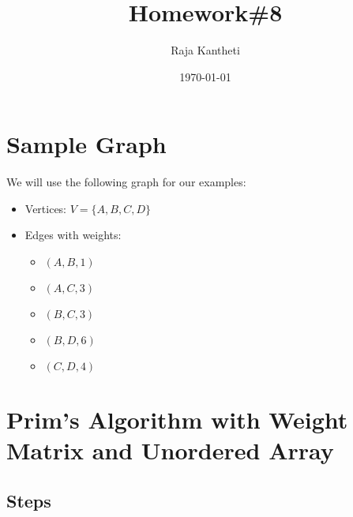 \documentclass{article}
\title{Homework\#8}
\author{Raja Kantheti}
\date{\today}
\begin{document}
\maketitle

\section{Sample Graph}

We will use the following graph for our examples:
\begin{itemize}
    \item Vertices: \( V = \{A, B, C, D\} \)
    \item Edges with weights: 
    \begin{itemize}
        \item \( (A, B, 1) \)
        \item \( (A, C, 3) \)
        \item \( (B, C, 3) \)
        \item \( (B, D, 6) \)
        \item \( (C, D, 4) \)
    \end{itemize}
\end{itemize}

\section{Prim's Algorithm with Weight Matrix and Unordered Array}

\subsection{Steps}
\end{document}
